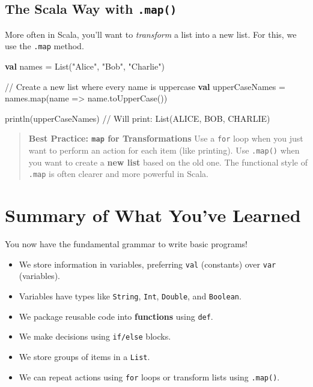 \documentclass[
  letterpaper,
  DIV=11,
  numbers=noendperiod]{scrreprt}
\newenvironment{Shaded}{\begin{snugshade}}{\end{snugshade}}
\newcommand{\CommentTok}[1]{\textcolor[rgb]{0.37,0.37,0.37}{#1}}
\newcommand{\ExtensionTok}[1]{\textcolor[rgb]{0.00,0.23,0.31}{#1}}
\newcommand{\FunctionTok}[1]{\textcolor[rgb]{0.28,0.35,0.67}{#1}}
\newcommand{\KeywordTok}[1]{\textcolor[rgb]{0.00,0.23,0.31}{\textbf{#1}}}
\newcommand{\NormalTok}[1]{\textcolor[rgb]{0.00,0.23,0.31}{#1}}
\newcommand{\OperatorTok}[1]{\textcolor[rgb]{0.37,0.37,0.37}{#1}}
\newcommand{\StringTok}[1]{\textcolor[rgb]{0.13,0.47,0.30}{#1}}
\providecommand{\tightlist}{%
  \setlength{\itemsep}{0pt}\setlength{\parskip}{0pt}}
\begin{document}
\subsection{\texorpdfstring{The Scala Way with
\texttt{.map()}}{The Scala Way with .map()}}\label{the-scala-way-with-.map}

More often in Scala, you'll want to \emph{transform} a list into a new
list. For this, we use the \texttt{.map} method.

\begin{Shaded}
\begin{Highlighting}[]
\KeywordTok{val}\NormalTok{ names }\OperatorTok{=} \ExtensionTok{List}\OperatorTok{(}\StringTok{"Alice"}\OperatorTok{,} \StringTok{"Bob"}\OperatorTok{,} \StringTok{"Charlie"}\OperatorTok{)}

\CommentTok{// Create a new list where every name is uppercase}
\KeywordTok{val}\NormalTok{ upperCaseNames }\OperatorTok{=}\NormalTok{ names}\OperatorTok{.}\FunctionTok{map}\OperatorTok{(}\NormalTok{name }\OperatorTok{=\textgreater{}}\NormalTok{ name}\OperatorTok{.}\FunctionTok{toUpperCase}\OperatorTok{())}

\FunctionTok{println}\OperatorTok{(}\NormalTok{upperCaseNames}\OperatorTok{)} \CommentTok{// Will print: List(ALICE, BOB, CHARLIE)}
\end{Highlighting}
\end{Shaded}

\begin{quote}
\textbf{Best Practice: \texttt{map} for Transformations} Use a
\texttt{for} loop when you just want to perform an action for each item
(like printing). Use \texttt{.map()} when you want to create a
\textbf{new list} based on the old one. The functional style of
\texttt{.map} is often clearer and more powerful in Scala.
\end{quote}

\section{Summary of What You've
Learned}\label{summary-of-what-youve-learned}

You now have the fundamental grammar to write basic programs!

\begin{itemize}
\tightlist
\item
  We store information in variables, preferring \texttt{val} (constants)
  over \texttt{var} (variables).
\item
  Variables have types like \texttt{String}, \texttt{Int},
  \texttt{Double}, and \texttt{Boolean}.
\item
  We package reusable code into \textbf{functions} using \texttt{def}.
\item
  We make decisions using \texttt{if/else} blocks.
\item
  We store groups of items in a \texttt{List}.
\item
  We can repeat actions using \texttt{for} loops or transform lists
  using \texttt{.map()}.
\end{itemize}
\end{document}
